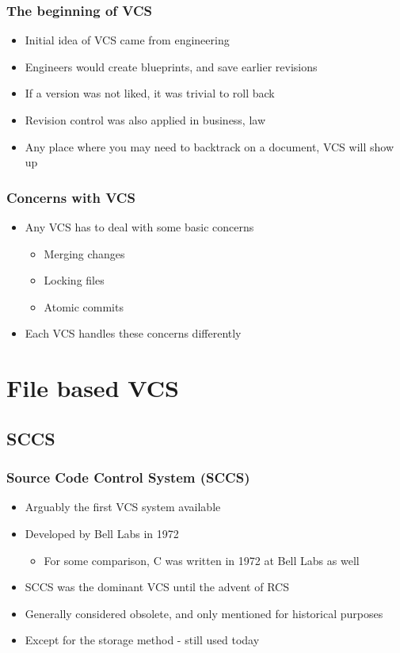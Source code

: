 \documentclass{beamer}
\begin{document}
\begin{frame}
  \frametitle{The beginning of VCS}
  \begin{itemize}
    \item Initial idea of VCS came from engineering
    \item Engineers would create blueprints, and save earlier revisions
    \item If a version was not liked, it was trivial to roll back
    \item Revision control was also applied in business, law
    \item Any place where you may need to backtrack on a document, VCS will show up
  \end{itemize}
\end{frame}

\begin{frame}
  \frametitle{Concerns with VCS}
  \begin{itemize}
    \item Any VCS has to deal with some basic concerns
      \begin{itemize}
	\item Merging changes
	\item Locking files
	\item Atomic commits
      \end{itemize}
    \item Each VCS handles these concerns differently
  \end{itemize}
\end{frame}

\section{File based VCS}

\subsection{SCCS}

\begin{frame}
  \frametitle{Source Code Control System (SCCS)}
  \begin{itemize}
    \item Arguably the first VCS system available
    \item Developed by Bell Labs in 1972
      \begin{itemize}
	\item For some comparison, C was written in 1972 at Bell Labs as well
      \end{itemize}
    \item SCCS was the dominant VCS until the advent of RCS 
    \item Generally considered obsolete, and only mentioned for historical purposes
    \item Except for the storage method - still used today
  \end{itemize}
\end{frame}
\end{document}
